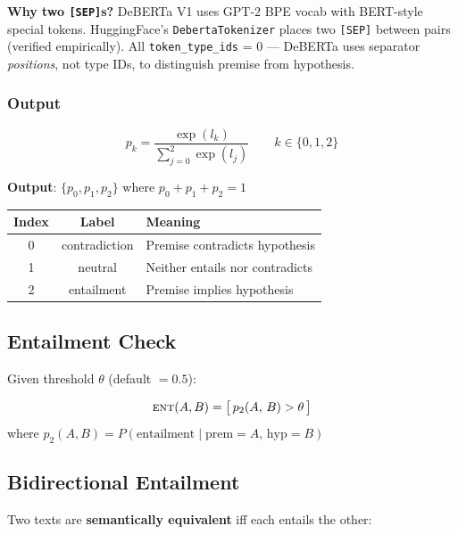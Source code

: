 \documentclass[10pt,a4paper,twocolumn]{article}
\begin{document}
{\scriptsize \textbf{Why two \texttt{[SEP]}s?} DeBERTa V1 uses GPT-2 BPE vocab with BERT-style special tokens. HuggingFace's \texttt{DebertaTokenizer} places two \texttt{[SEP]} between pairs (verified empirically). All \texttt{token\_type\_ids} = 0 --- DeBERTa uses separator \emph{positions}, not type IDs, to distinguish premise from hypothesis.}

\subsubsection{Output}

\begin{mathbox}[title=Softmax to Probabilities]
\[
p_k = \frac{\exp(l_k)}{\sum_{j=0}^{2}\exp(l_j)} \qquad k \in \{0,1,2\}
\]
\end{mathbox}

\textbf{Output}: $\{p_0, p_1, p_2\}$ where $p_0 + p_1 + p_2 = 1$

\begin{small}
\begin{tabular}{@{}ccl@{}}
\toprule
\textbf{Index} & \textbf{Label} & \textbf{Meaning} \\
\midrule
0 & contradiction & Premise contradicts hypothesis \\
1 & neutral & Neither entails nor contradicts \\
2 & entailment & Premise implies hypothesis \\
\bottomrule
\end{tabular}
\end{small}

\subsection{Entailment Check}

Given threshold $\theta$ (default $= 0.5$):

\begin{mathbox}[title=One-Way Entailment]
\[
\textsc{ent}(A, B) = \bigl[\, p_2(A,\, B) > \theta \,\bigr]
\]
\smallskip
{\scriptsize where $p_2(A,B) = P(\text{entailment}\mid\text{prem}{=}A,\,\text{hyp}{=}B)$}
\end{mathbox}

\subsection{Bidirectional Entailment}

Two texts are \textbf{semantically equivalent} iff each entails the other:
\end{document}
